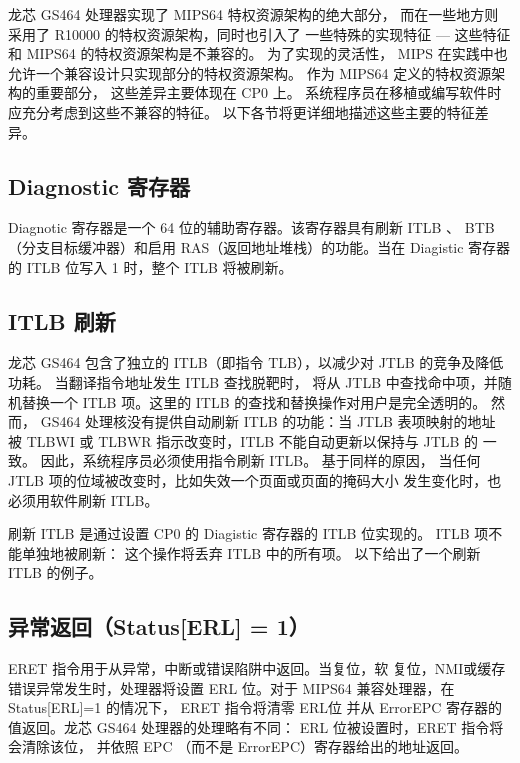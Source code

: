 龙芯 GS464 处理器实现了 MIPS64 特权资源架构的绝大部分， 而在一些地方则采用了
R10000 的特权资源架构，同时也引入了 一些特殊的实现特征 --- 这些特征和 MIPS64
的特权资源架构是不兼容的。 为了实现的灵活性， MIPS 在实践中也
允许一个兼容设计只实现部分的特权资源架构。 作为 MIPS64
定义的特权资源架构的重要部分， 这些差异主要体现在 CP0 上。
系统程序员在移植或编写软件时应充分考虑到这些不兼容的特征。
以下各节将更详细地描述这些主要的特征差异。

\subsection{Diagnostic 寄存器}

Diagnotic 寄存器是一个 64 位的辅助寄存器。该寄存器具有刷新 ITLB 、
BTB （分支目标缓冲器）和启用 RAS（返回地址堆栈）的功能。当在 Diagistic 寄存器
的 ITLB 位写入 1 时，整个 ITLB 将被刷新。

\subsection{ITLB 刷新}\label{subsec:itlb-flushing}

龙芯 GS464 包含了独立的 ITLB（即指令 TLB），以减少对
JTLB 的竞争及降低功耗。 当翻译指令地址发生 ITLB 查找脱靶时，
将从 JTLB 中查找命中项，并随机替换一个 ITLB 项。这里的 ITLB
的查找和替换操作对用户是完全透明的。
然而， GS464 处理核没有提供自动刷新 ITLB 的功能：当 JTLB 表项映射的地址
被 TLBWI 或 TLBWR 指示改变时，ITLB 不能自动更新以保持与 JTLB 的
一致。 因此，系统程序员必须使用指令刷新 ITLB。 基于同样的原因，
当任何 JTLB 项的位域被改变时，比如失效一个页面或页面的掩码大小
发生变化时，也必须用软件刷新 ITLB。

刷新 ITLB 是通过设置 CP0 的 Diagistic 寄存器的 ITLB 位实现的。
ITLB 项不能单独地被刷新： 这个操作将丢弃 ITLB 中的所有项。
以下给出了一个刷新 ITLB 的例子。



\subsection{异常返回（Status[ERL] = 1）}

ERET 指令用于从异常，中断或错误陷阱中返回。当复位，软
复位，NMI或缓存错误异常发生时，处理器将设置 ERL 位。对于
MIPS64 兼容处理器，在 Status[ERL]=1 的情况下， ERET 指令将清零
ERL位 并从 ErrorEPC 寄存器的值返回。龙芯 GS464 处理器的处理略有不同：
ERL 位被设置时，ERET 指令将会清除该位， 并依照 EPC
（而不是 ErrorEPC）寄存器给出的地址返回。

